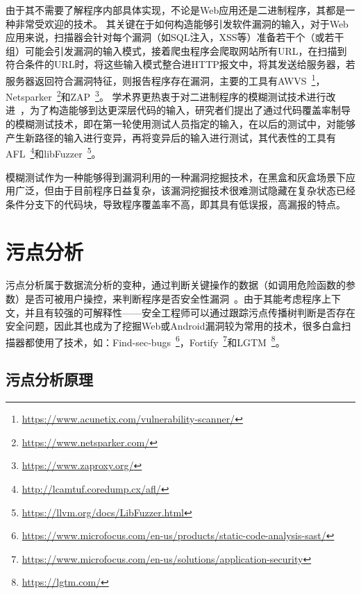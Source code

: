由于其不需要了解程序内部具体实现，不论是Web应用还是二进制程序，其都是一种非常受欢迎的技术。
其关键在于如何构造能够引发软件漏洞的输入，对于Web应用来说，扫描器会针对每个漏洞（如SQL注入，XSS等）准备若干个（或若干组）可能会引发漏洞的输入模式，接着爬虫程序会爬取网站所有URL，在扫描到符合条件的URL时，将这些输入模式整合进HTTP报文中，将其发送给服务器，若服务器返回符合漏洞特征，则报告程序存在漏洞，主要的工具有AWVS~\footnote{\url{https://www.acunetix.com/vulnerability-scanner/}}，Netsparker~\footnote{\url{https://www.netsparker.com/}}和ZAP~\footnote{\url{https://www.zaproxy.org/}}。
学术界更热衷于对二进制程序的模糊测试技术进行改进~\cite{artoffuzz}，为了构造能够到达更深层代码的输入，研究者们提出了通过代码覆盖率制导的模糊测试技术，即在第一轮使用测试人员指定的输入，在以后的测试中，对能够产生新路径的输入进行变异，再将变异后的输入进行测试，其代表性的工具有AFL~\footnote{\url{http://lcamtuf.coredump.cx/afl/}}和libFuzzer~\footnote{\url{https://llvm.org/docs/LibFuzzer.html}}。

模糊测试作为一种能够得到漏洞利用的一种漏洞挖掘技术，在黑盒和灰盒场景下应用广泛，但由于目前程序日益复杂，该漏洞挖掘技术很难测试隐藏在复杂状态已经条件分支下的代码块，导致程序覆盖率不高，即其具有低误报，高漏报的特点。

\section{污点分析}
污点分析属于数据流分析的变种，通过判断关键操作的数据（如调用危险函数的参数）是否可被用户操控，来判断程序是否安全性漏洞~\cite{taint:wanglei}。由于其能考虑程序上下文，并且有较强的可解释性——安全工程师可以通过跟踪污点传播树判断是否存在安全问题，因此其也成为了挖掘Web或Android漏洞较为常用的技术，很多白盒扫描器都使用了技术，如：Find-sec-bugs~\footnote{\url{https://www.microfocus.com/en-us/products/static-code-analysis-sast/}}，Fortify~\footnote{\url{https://www.microfocus.com/en-us/solutions/application-security}}和LGTM~\footnote{\url{https://lgtm.com/}}。\\

\subsection{污点分析原理}

